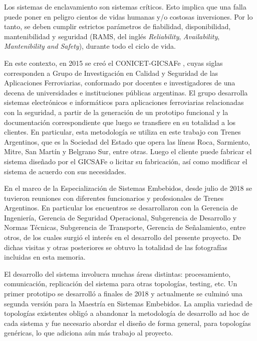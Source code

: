 		Los sistemas de enclavamiento son sistemas críticos. Esto implica que una falla puede poner en peligro cientos de vidas humanas y/o costosas inversiones. Por lo tanto, se deben cumplir estrictos parámetros de fiabilidad, disponibilidad, mantenibilidad y seguridad (RAMS, del inglés \textit{Reliability}, \textit{Availability}, \textit{Mantenibility} \textit{and} \textit{Safety}), durante todo el ciclo de vida.
		
		En este contexto, en 2015 se creó el CONICET-GICSAFe \cite{GICSAFE}, cuyas siglas corresponden a Grupo de Investigación en Calidad y Seguridad de las Aplicaciones Ferroviarias, conformado por docentes e investigadores de una decena de universidades e instituciones públicas argentinas. El grupo desarrolla sistemas electrónicos e informáticos para aplicaciones ferroviarias relacionadas con la seguridad, a partir de la generación de un prototipo funcional y la documentación correspondiente que luego se transfiere en su totalidad a los clientes. En particular, esta metodología se utiliza en este trabajo con Trenes Argentinos\cite{Trenes}, que es la Sociedad del Estado que opera las líneas Roca, Sarmiento, Mitre, San Martín y Belgrano Sur, entre otras. Luego el cliente puede fabricar el sistema diseñado por el GICSAFe o licitar su fabricación, así como modificar el sistema de acuerdo con sus necesidades.   
	
		En el marco de la Especialización de Sistemas Embebidos, desde julio de 2018 se tuvieron reuniones con diferentes funcionarios y profesionales de Trenes Argentinos. En particular los encuentros se desarrollaron con la Gerencia de Ingeniería, Gerencia de Seguridad Operacional, Subgerencia de Desarrollo y Normas Técnicas, Subgerencia de Transporte, Gerencia de Señalamiento, entre otros, de los cuales surgió el interés en el desarrollo del presente proyecto. De dichas visitas y otras posteriores se obtuvo la totalidad de las fotografías incluidas en esta memoria.
			 	
		El desarrollo del sistema involucra muchas áreas distintas: procesamiento, comunicación, replicación del sistema para otras topologías, testing, etc. Un primer prototipo se desarrolló a finales de 2018 y actualmente se culminó una segunda versión para la Maestría en Sistemas Embebidos. La amplia variedad de topologías existentes obligó a abandonar la metodología de desarrollo ad hoc de cada sistema y fue necesario abordar el diseño de forma general, para topologías genéricas, lo que adiciona aún más trabajo al proyecto.		
		
